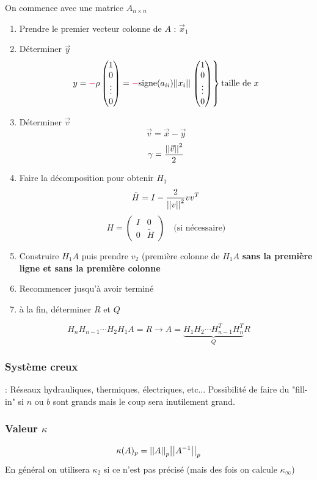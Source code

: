 \documentclass[resume]{subfiles}
\begin{document}
On commence avec une matrice $A_{n\times n}$
\begin{enumerate}
\item Prendre le premier vecteur colonne de $A$ : $\vec{x}_1$
\item Déterminer $\vec{y}$
$$y=\textcolor{OrangeRed}{-}\rho\begin{pmatrix}
1\\0\\\vdots\\0
\end{pmatrix}=\textcolor{OrangeRed}{-}\text{signe}(a_{ii})\abs{\abs{x_i}}\left.\begin{pmatrix}
1\\0\\\vdots\\0
\end{pmatrix}\right\rbrace\text{taille de }x$$
\item Déterminer $\vec{v}$
$$\vec{v}=\vec{x}-\vec{y}$$
$$\gamma=\frac{\abs{\abs{\vec{v}}}^2}{2}$$
\item Faire la décomposition pour obtenir $H_1$
$$\tilde{H}=I-\frac{2}{\abs{\abs{v}}^2}vv^T$$
$$H=\begin{pmatrix}
I & 0\\
0 & \tilde{H}
\end{pmatrix}\quad \text{(si nécessaire)}$$

\item Construire $H_1A$ puis prendre $v_2$ (première colonne de $H_1A$ \textbf{sans la première ligne et sans la première colonne}
\item Recommencer jusqu'à avoir terminé
\item à la fin, déterminer $R$ et $Q$
\end{enumerate}
$$H_nH_{n-1}\cdots H_2H_1A=R\longrightarrow A=\underbrace{H_1H_2\cdots H_{n-1}^TH_n^T}_{Q}R$$

\subsubsection{Système creux} : Réseaux hydrauliques, thermiques, électriques, etc... Possibilité de faire du "fill-in" si $n$ ou $b$ sont grands mais le coup sera inutilement grand.
\subsubsection{Valeur $\kappa$}
$$\kappa(A)_p=\abs{\abs{A}}_p\abs{\abs{A^{-1}}}_p$$
En général on utilisera $\kappa_2$ si ce n'est pas précisé (mais des fois on calcule $\kappa_\infty$)
\end{document}
